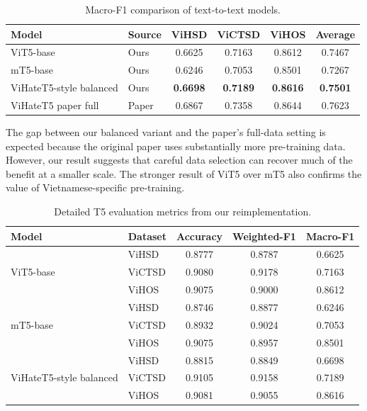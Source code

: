 \documentclass[journal]{IEEEtran}
\begin{document}
\begin{table}[!t]
\centering
\caption{Macro-F1 comparison of text-to-text models.}
\label{tab:t5models}
\begin{tabular}{llcccc}
\toprule
\textbf{Model} & \textbf{Source} & \textbf{ViHSD} & \textbf{ViCTSD} & \textbf{ViHOS} & \textbf{Average} \\
\midrule
ViT5-base & Ours & 0.6625 & 0.7163 & 0.8612 & 0.7467 \\
mT5-base & Ours & 0.6246 & 0.7053 & 0.8501 & 0.7267 \\
ViHateT5-style balanced & Ours & \textbf{0.6698} & \textbf{0.7189} & \textbf{0.8616} & \textbf{0.7501} \\
ViHateT5 paper full & Paper & 0.6867 & 0.7358 & 0.8644 & 0.7623 \\
\bottomrule
\end{tabular}
\end{table}

The gap between our balanced variant and the paper's full-data setting is expected because the original paper uses substantially more pre-training data. However, our result suggests that careful data selection can recover much of the benefit at a smaller scale. The stronger result of ViT5 over mT5 also confirms the value of Vietnamese-specific pre-training.

\begin{table}[!t]
\centering
\caption{Detailed T5 evaluation metrics from our reimplementation.}
\label{tab:t5detail}
\begin{tabular}{llccc}
\toprule
\textbf{Model} & \textbf{Dataset} & \textbf{Accuracy} & \textbf{Weighted-F1} & \textbf{Macro-F1} \\
\midrule
\multirow{3}{*}{ViT5-base}
& ViHSD & 0.8777 & 0.8787 & 0.6625 \\
& ViCTSD & 0.9080 & 0.9178 & 0.7163 \\
& ViHOS & 0.9075 & 0.9000 & 0.8612 \\
\midrule
\multirow{3}{*}{mT5-base}
& ViHSD & 0.8746 & 0.8877 & 0.6246 \\
& ViCTSD & 0.8932 & 0.9024 & 0.7053 \\
& ViHOS & 0.9075 & 0.8957 & 0.8501 \\
\midrule
\multirow{3}{*}{ViHateT5-style balanced}
& ViHSD & 0.8815 & 0.8849 & 0.6698 \\
& ViCTSD & 0.9105 & 0.9158 & 0.7189 \\
& ViHOS & 0.9081 & 0.9055 & 0.8616 \\
\bottomrule
\end{tabular}
\end{table}
\end{document}
